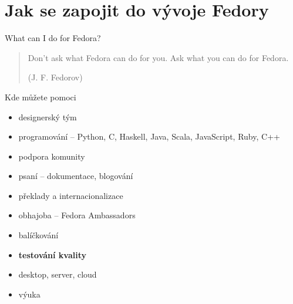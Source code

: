 \documentclass[11pt]{beamer}
\begin{document}
\section{Jak se zapojit do vývoje Fedory}

\begin{frame}{What can I do for Fedora?}
	
\begin{quotation}
	Don't ask what Fedora can do for you. Ask what you can do for Fedora. 
	\begin{flushright}
			(J. F. Fedorov)
	\end{flushright}	
\end{quotation}
\end{frame}

\begin{frame}{Kde můžete pomoci}
	\begin{itemize}
		\item designerský tým
		\item programování -- Python, C, Haskell, Java, Scala, JavaScript, Ruby, C++ 
		\item podpora komunity
		\item psaní -- dokumentace, blogování
		\item překlady a internacionalizace
		\item obhajoba -- Fedora Ambassadors
		\item balíčkování
		\item \textbf{testování kvality}
		\item desktop, server, cloud
		\item výuka
	\end{itemize}
\end{frame}
\end{document}
